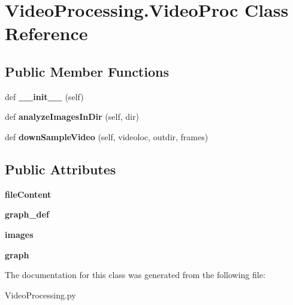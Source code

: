 \hypertarget{class_video_processing_1_1_video_proc}{}\section{Video\+Processing.\+Video\+Proc Class Reference}
\label{class_video_processing_1_1_video_proc}
\subsection*{Public Member Functions}
\begin{DoxyCompactItemize}
\item 
\mbox{\label{class_video_processing_1_1_video_proc_a017d1f4d8f1548d0a183c0be905de838}} 
def {\bfseries \+\_\+\+\_\+init\+\_\+\+\_\+} (self)
\item 
\mbox{\label{class_video_processing_1_1_video_proc_ac66d79ef63216da26b71161bd22c17ac}} 
def {\bfseries analyze\+Images\+In\+Dir} (self, dir)
\item 
\mbox{\label{class_video_processing_1_1_video_proc_a55be132c791c5d5c254d7d1247560791}} 
def {\bfseries down\+Sample\+Video} (self, videoloc, outdir, frames)
\end{DoxyCompactItemize}
\subsection*{Public Attributes}
\begin{DoxyCompactItemize}
\item 
\mbox{\label{class_video_processing_1_1_video_proc_a797b03540eb757ae02a8ca1e477f1ab4}} 
{\bfseries file\+Content}
\item 
\mbox{\label{class_video_processing_1_1_video_proc_a3a79d599b8c4f380d32f2658eb63e1f7}} 
{\bfseries graph\+\_\+def}
\item 
\mbox{\label{class_video_processing_1_1_video_proc_a84d8df71e47460997b3b6804a9cedb79}} 
{\bfseries images}
\item 
\mbox{\label{class_video_processing_1_1_video_proc_ab41532f55617f7bd019b5f71109b0f2d}} 
{\bfseries graph}
\end{DoxyCompactItemize}


The documentation for this class was generated from the following file\+:\begin{DoxyCompactItemize}
\item 
Video\+Processing.\+py\end{DoxyCompactItemize}

